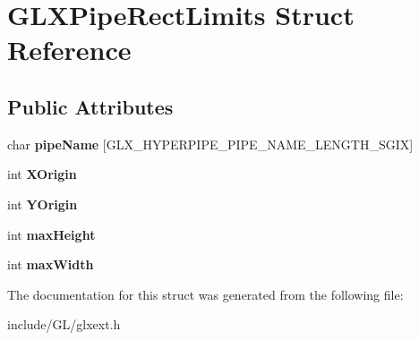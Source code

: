 \hypertarget{structGLXPipeRectLimits}{\section{\-G\-L\-X\-Pipe\-Rect\-Limits \-Struct \-Reference}
\label{structGLXPipeRectLimits}
}
\subsection*{\-Public \-Attributes}
\begin{DoxyCompactItemize}
\item 
\hypertarget{structGLXPipeRectLimits_ae78b4b6656101bc841946733a5b6e5ce}{char {\bfseries pipe\-Name} \mbox{[}\-G\-L\-X\-\_\-\-H\-Y\-P\-E\-R\-P\-I\-P\-E\-\_\-\-P\-I\-P\-E\-\_\-\-N\-A\-M\-E\-\_\-\-L\-E\-N\-G\-T\-H\-\_\-\-S\-G\-I\-X\mbox{]}}\label{structGLXPipeRectLimits_ae78b4b6656101bc841946733a5b6e5ce}

\item 
\hypertarget{structGLXPipeRectLimits_a3e5a965059d9f5d2ca42acd35af5bb9b}{int {\bfseries \-X\-Origin}}\label{structGLXPipeRectLimits_a3e5a965059d9f5d2ca42acd35af5bb9b}

\item 
\hypertarget{structGLXPipeRectLimits_a50e06bcf0dae95854be7d93a515199e9}{int {\bfseries \-Y\-Origin}}\label{structGLXPipeRectLimits_a50e06bcf0dae95854be7d93a515199e9}

\item 
\hypertarget{structGLXPipeRectLimits_a27572e499c0d3280031c2ad8e387c0c1}{int {\bfseries max\-Height}}\label{structGLXPipeRectLimits_a27572e499c0d3280031c2ad8e387c0c1}

\item 
\hypertarget{structGLXPipeRectLimits_a8662c7a712b30620e25fc994adf337a1}{int {\bfseries max\-Width}}\label{structGLXPipeRectLimits_a8662c7a712b30620e25fc994adf337a1}

\end{DoxyCompactItemize}


\-The documentation for this struct was generated from the following file\-:\begin{DoxyCompactItemize}
\item 
include/\-G\-L/glxext.\-h\end{DoxyCompactItemize}

